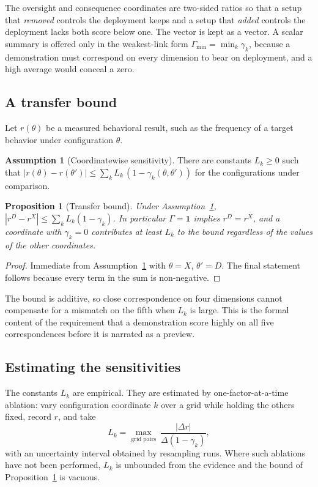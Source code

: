 \documentclass[11pt]{article}
\newtheorem{proposition}[theorem]{Proposition}
\theoremstyle{definition}
\newtheorem{assumption}[theorem]{Assumption}
\begin{document}
The oversight and consequence coordinates are two-sided ratios so that a setup that \emph{removed} controls the deployment keeps and a setup that \emph{added} controls the deployment lacks both score below one. The vector is kept as a vector. A scalar summary is offered only in the weakest-link form $\Gamma_{\min}=\min_k\gamma_k$, because a demonstration must correspond on every dimension to bear on deployment, and a high average would conceal a zero.

\subsection{A transfer bound}

Let $r(\theta)$ be a measured behavioral result, such as the frequency of a target behavior under configuration $\theta$.

\begin{assumption}[Coordinatewise sensitivity]\label{ass:C1}
There are constants $L_k\ge0$ such that $|r(\theta)-r(\theta')|\le\sum_{k}L_k\,(1-\gamma_k(\theta,\theta'))$ for the configurations under comparison.
\end{assumption}

\begin{proposition}[Transfer bound]\label{prop:C1}
Under Assumption~\ref{ass:C1}, $|r^D-r^X|\le\sum_kL_k(1-\gamma_k)$. In particular $\Gamma=\mathbf{1}$ implies $r^D=r^X$, and a coordinate with $\gamma_k=0$ contributes at least $L_k$ to the bound regardless of the values of the other coordinates.
\end{proposition}
\begin{proof}
Immediate from Assumption~\ref{ass:C1} with $\theta=X$, $\theta'=D$. The final statement follows because every term in the sum is non-negative.
\end{proof}

The bound is additive, so close correspondence on four dimensions cannot compensate for a mismatch on the fifth when $L_k$ is large. This is the formal content of the requirement that a demonstration score highly on all five correspondences before it is narrated as a preview.

\subsection{Estimating the sensitivities}

The constants $L_k$ are empirical. They are estimated by one-factor-at-a-time ablation: vary configuration coordinate $k$ over a grid while holding the others fixed, record $r$, and take
\[
\hat L_k=\max_{\text{grid pairs}}\ \frac{|\Delta r|}{\Delta(1-\gamma_k)},
\]
with an uncertainty interval obtained by resampling runs. Where such ablations have not been performed, $L_k$ is unbounded from the evidence and the bound of Proposition~\ref{prop:C1} is vacuous.
\end{document}
